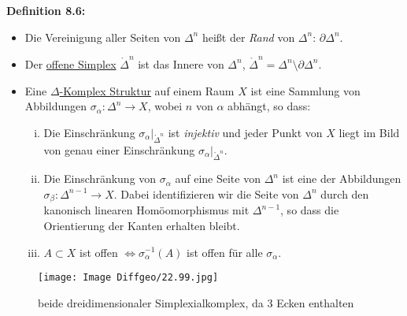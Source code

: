 \documentclass[fleqn, 12pt, letterpaper]{article}
\begin{document}
\textbf{Definition 8.6:}
\begin{itemize}
  \item Die Vereinigung aller Seiten von $\Delta^n$ heißt der \emph{Rand} von $\Delta^n$: $\partial \Delta^n$.

  \item Der \underline{offene Simplex} $\mathring{\Delta}^n$ ist das Innere von $\Delta^n$, $\mathring{\Delta}^n = \Delta^n \setminus \partial \Delta^n$.

  \item Eine \underline{$\Delta$-Komplex Struktur} auf einem Raum $X$ ist eine Sammlung von Abbildungen $\sigma_\alpha \colon \Delta^n \to X$, wobei $n$ von $\alpha$ abhängt, so dass:
  \begin{enumerate}[i)]
    \item Die Einschränkung $\sigma_\alpha|_{\mathring{\Delta}^n}$ ist \emph{injektiv} und jeder Punkt von $X$ liegt im Bild von genau einer Einschränkung $\sigma_\alpha|_{\mathring{\Delta}^n}$.
    
    \item Die Einschränkung von $\sigma_\alpha$ auf eine Seite von $\Delta^n$ ist eine der Abbildungen $\sigma_\beta \colon \Delta^{n-1} \to X$. Dabei identifizieren wir die Seite von $\Delta^n$ durch den kanonisch linearen Homöomorphismus mit $\Delta^{n-1}$, so dass die Orientierung der Kanten erhalten bleibt.
    
    \item $A \subset X$ ist offen $\iff \sigma_\alpha^{-1}(A)$ ist offen für alle $\sigma_\alpha$.
  \end{enumerate}
\end{itemize}
\begin{figure}[H]
    \centering
    \texttt{[image: Image Diffgeo/22.99.jpg]}
    \caption{beide dreidimensionaler Simplexialkomplex, da 3 Ecken enthalten}
 \end{figure}
\end{document}
